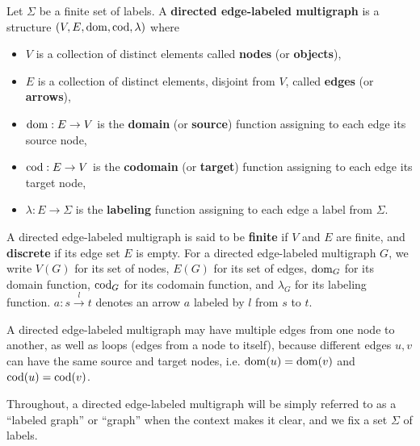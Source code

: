\begin{definition} 
    \label{def:graph}
     Let \(\Sigma\) be a finite set of labels. A \textbf{directed edge-labeled multigraph} is a structure \((V, E, \operatorname{dom}, \operatorname{cod},\lambda)\) where
    \begin{itemize}
        \item $V$ is a collection of distinct elements called \textbf{nodes} (or \textbf{objects}),
        \item $E$ is a collection of distinct elements, disjoint from $V$, called \textbf{edges} (or \textbf{arrows}),
        \item $\operatorname{dom}: E \to V$ is the \textbf{domain} (or \textbf{source}) function assigning to each edge its source node,
        \item $\operatorname{cod}: E \to V$ is the \textbf{codomain} (or \textbf{target}) function assigning to each edge its target node,
        \item $\lambda: E \to \Sigma$ is the \textbf{labeling} function assigning to each edge a label from $\Sigma$.
    \end{itemize}
    A directed edge-labeled multigraph is said to be \textbf{finite} if $V$ and $E$ are finite, and \textbf{discrete} if its edge set \(E\) is empty.
    For a directed edge-labeled multigraph \( G \), we write \( V(G) \) for its set of nodes, \( E(G) \) for its set of edges, \( \operatorname{dom}_G \) for its domain function, \( \operatorname{cod}_G \) for its codomain function, and \( \lambda_G \) for its labeling function. $a : s\overset{l}{\rightarrow} t$ denotes an arrow $a$ labeled by $l$ from $s$ to $t$.
\end{definition}
A directed edge-labeled multigraph may have multiple edges from one node to another, as well as loops (edges from a node to itself), because different edges $u,v$ can have the same source and target nodes, i.e. $\operatorname{dom}(u) = \operatorname{dom}(v)$ and $\operatorname{cod}(u) = \operatorname{cod}(v)$.

    Throughout, a directed edge-labeled multigraph will be simply referred to as a \enquote{labeled graph} or \enquote{graph} when the context makes it clear, and we fix a set $\Sigma$ of labels.



